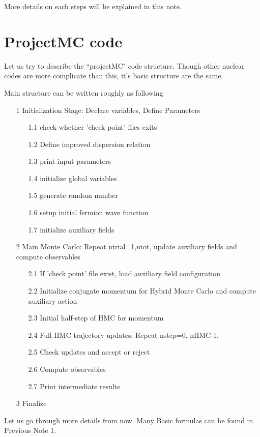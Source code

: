 \documentclass[10pt]{book}
\begin{document}
More details on each steps will be explained in this note. 

\chapter{ProjectMC code}
Let us try to describe the ``projectMC" code structure. Though other nuclear codes
are more complicate than this, it's basic structure are the same.

Main structure can be written roughly as following
\begin{framed}
\begin{itemize}
\item[1] Initialization Stage: Declare variables, Define Parameters
  \begin{itemize}
  \item[1.1] check whether 'check point' files exits
  \item[1.2] Define improved dispersion relation
  \item[1.3] print input parameters
  \item[1.4] initialize global variables
  \item[1.5] generate random number
  \item[1.6] setup initial fermion wave function
  \item[1.7] initialize auxiliary fields
  \end{itemize}
\item[2] Main Monte Carlo: Repeat ntrial=1,ntot, update auxiliary fields and
  compute observables
  \begin{itemize}
  \item[2.1] If 'check point' file exist, load auxiliary field configuration
  \item[2.2] Initialize conjugate momentum for Hybrid Monte Carlo and compute auxiliary action
  \item[2.3] Initial half-step of HMC for momentum
  \item[2.4] Full HMC trajectory updates: Repeat nstep=0, nHMC-1. 
  \item[2.5] Check updates and accept or reject
  \item[2.6] Compute observables
  \item[2.7] Print intermediate results
  \end{itemize}
\item[3] Finalize  
\end{itemize}
\end{framed}
Let us go through more details from now.
Many Basic formulas can be found in Previous Note 1. 
\end{document}
